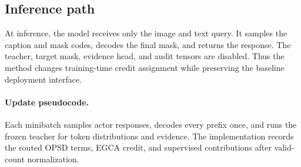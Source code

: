 \documentclass{article}
\begin{document}
\subsection{Inference path}At inference, the model receives only the image and text query. It samples the caption and mask codes, decodes the final mask, and returns the response. The teacher, target mask, evidence head, and audit tensors are disabled. Thus the method changes training-time credit assignment while preserving the baseline deployment interface.
\paragraph{Update pseudocode.}Each minibatch samples actor responses, decodes every prefix once, and runs the frozen teacher for token distributions and evidence. The implementation records the routed OPSD terms, EGCA credit, and supervised contributions after valid-count normalization.
\end{document}
